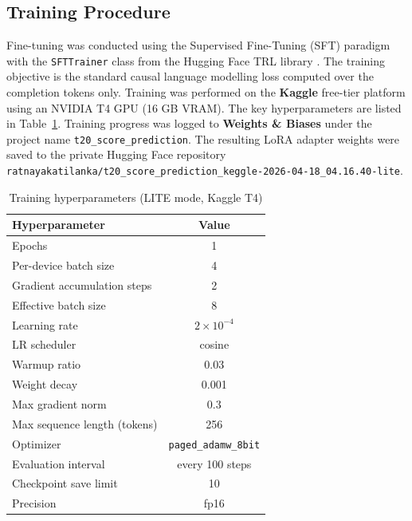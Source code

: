 \subsection{Training Procedure}

Fine-tuning was conducted using the Supervised Fine-Tuning (SFT) paradigm with the \texttt{SFTTrainer} class from the Hugging Face TRL library \cite{vonwerra2022trl}. The training objective is the standard causal language modelling loss computed over the completion tokens only. Training was performed on the \textbf{Kaggle} free-tier platform using an NVIDIA T4 GPU (16 GB VRAM). The key hyperparameters are listed in Table~\ref{tab:hyperparams}. Training progress was logged to \textbf{Weights \& Biases} under the project name \texttt{t20\_score\_prediction}. The resulting LoRA adapter weights were saved to the private Hugging Face repository \texttt{ratnayakatilanka/t20\_score\_prediction\-\_keggle-2026-04-18\_04.16.40-lite}.

\begin{table}[ht]
\centering
\caption{Training hyperparameters (LITE mode, Kaggle T4)}
\label{tab:hyperparams}
\begin{tabular}{lc}
\hline
\textbf{Hyperparameter} & \textbf{Value} \\
\hline
Epochs                         & 1 \\
Per-device batch size          & 4 \\
Gradient accumulation steps    & 2 \\
Effective batch size           & 8 \\
Learning rate                  & $2 \times 10^{-4}$ \\
LR scheduler                   & cosine \\
Warmup ratio                   & 0.03 \\
Weight decay                   & 0.001 \\
Max gradient norm              & 0.3 \\
Max sequence length (tokens)   & 256 \\
Optimizer                      & \texttt{paged\_adamw\_8bit} \\
Evaluation interval            & every 100 steps \\
Checkpoint save limit          & 10 \\
Precision                      & fp16 \\
\hline
\end{tabular}
\end{table}

